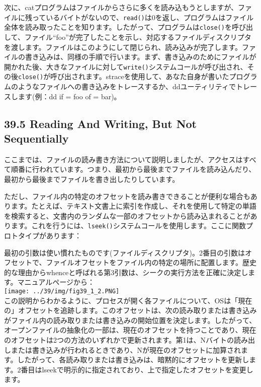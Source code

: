 次に、catプログラムはファイルからさらに多くを読み込もうとしますが、ファイルに残っているバイトがないので、\texttt{read()}は0を返し、プログラムはファイル全体を読み取ったことを知ります。したがって、プログラムは\texttt{close()}を呼び出して、ファイル``foo''が完了したことを示し、対応するファイルディスクリプタを渡します。ファイルはこのようにして閉じられ、読み込みが完了します。ファイルの書き込みは、同様の手順で行います。まず、書き込みのためにファイルが開かれた後、大きなファイルに対して\texttt{write()}システムコールが呼び出され、その後\texttt{close()}が呼び出されます。straceを使用して、あなた自身が書いたプログラムのようなファイルへの書き込みをトレースするか、ddユーティリティでトレースします(例：dd
if = foo of = bar)。

\hypertarget{reading-and-writing-but-not-sequentially}{%
\subsection*{39.5 Reading And Writing, But Not
Sequentially}\label{reading-and-writing-but-not-sequentially}}

ここまでは、ファイルの読み書き方法について説明しましたが、アクセスはすべて順番に行われています。つまり、最初から最後までファイルを読み込んだり、最初から最後までファイルを書き出したりしています。

ただし、ファイル内の特定のオフセットを読み書きできることが便利な場合もあります。たとえば、テキスト文書上に索引を作成し、それを使用して特定の単語を検索すると、文書内のランダムな一部のオフセットから読み込まれることがあります。これを行うには、\texttt{lseek()}システムコールを使用します。ここに関数プロトタイプがあります：

\begin{Shaded}
\begin{Highlighting}[]
\end{Highlighting}
\end{Shaded}

最初の引数は使い慣れたものです(ファイルディスクリプタ)。2番目の引数はオフセットで、ファイルオフセットをファイル内の特定の場所に配置します。歴史的な理由からwhenceと呼ばれる第3引数は、シークの実行方法を正確に決定します。マニュアルページから：\\
\texttt{[image: ../39/img/fig39\_1\_2.PNG]}\\
この説明からわかるように、プロセスが開く各ファイルについて、OSは「現在の」オフセットを追跡します。このオフセットは、次の読み取りまたは書き込みがファイル内の読み取りまたは書き込みの開始位置を決定します。したがって、オープンファイルの抽象化の一部は、現在のオフセットを持つことであり、現在のオフセットは2つの方法のいずれかで更新されます。第1は、Nバイトの読み出しまたは書き込みが行われるときであり、Nが現在のオフセットに加算されます。したがって、各読み取りまたは書き込みは、暗黙的にオフセットを更新します。2番目はlseekで明示的に指定されており、上で指定したオフセットを変更します。

